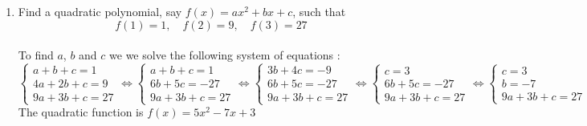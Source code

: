 \documentclass[a4paper]{article}
\begin{document}
\begin{enumerate}
    \item Find a quadratic polynomial, say $f(x) = ax^2 + bx + c$, such that
    \[
    f(1) = 1, \quad f(2) = 9, \quad f(3) = 27
    \]
    \hrulefill\\
    To find $a$, $b$ and $c$ we we solve the following system of equations :\\
$\begin{cases}a+b+c=1\\4a+2b+c=9\\9a+3b+c=27\end{cases} \Leftrightarrow \begin{cases}a+b+c=1\\6b+5c=-27\\9a+3b+c=27\end{cases} \Leftrightarrow \begin{cases}3b+4c=-9\\6b+5c=-27\\9a+3b+c=27\end{cases} \Leftrightarrow \begin{cases}c=3\\6b+5c=-27\\9a+3b+c=27\end{cases} \Leftrightarrow \begin{cases}c=3\\b=-7\\9a+3b+c=27\end{cases} \Leftrightarrow \begin{cases}c=3\\b=-7\\a=5\end{cases}$\\
The quadratic function is $f(x)=5x^{2}-7x+3$\\
    

\end{enumerate}
\end{document}
